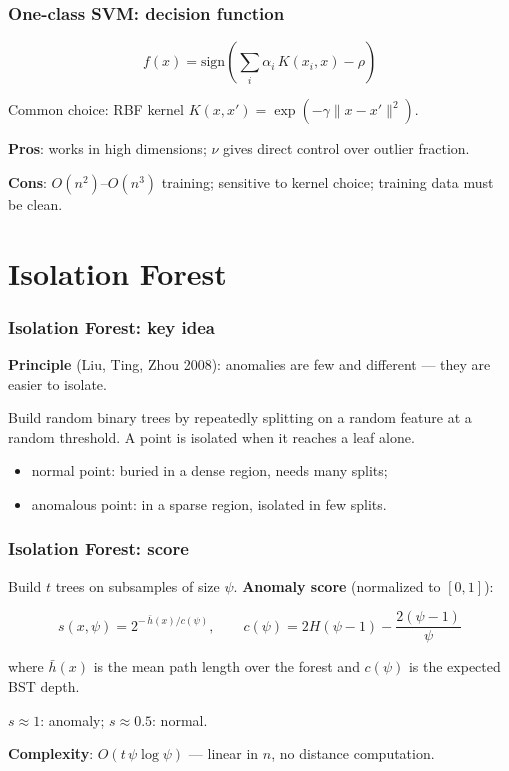 \documentclass[]{beamer}
\begin{document}
\begin{frame}[fragile]
\frametitle{One-class SVM: decision function}
\begin{equation*}
f(x) = \mathrm{sign}\!\left(\sum_{i} \alpha_i\, K(x_i, x) - \rho\right)
\end{equation*}

Common choice: RBF kernel $K(x, x') = \exp(-\gamma \|x - x'\|^2)$.

\textbf{Pros}: works in high dimensions; $\nu$ gives direct control over outlier fraction.

\textbf{Cons}: $O(n^2)$--$O(n^3)$ training; sensitive to kernel choice; training data must be clean.

\end{frame}

\section{Isolation Forest}

\begin{frame}[fragile]
\frametitle{Isolation Forest: key idea}
\textbf{Principle} (Liu, Ting, Zhou 2008): anomalies are few and different --- they are easier to isolate.

Build random binary trees by repeatedly splitting on a random feature at a random threshold. A point is isolated when it reaches a leaf alone.

\begin{itemize}
  \item normal point: buried in a dense region, needs many splits;
  \item anomalous point: in a sparse region, isolated in few splits.
\end{itemize}

\end{frame}

\begin{frame}[fragile]
\frametitle{Isolation Forest: score}
Build $t$ trees on subsamples of size $\psi$. \textbf{Anomaly score} (normalized to $[0,1]$):

\begin{equation*}
s(x,\psi) = 2^{-\,\bar{h}(x) / c(\psi)}, \qquad c(\psi) = 2H(\psi - 1) - \frac{2(\psi-1)}{\psi}
\end{equation*}

where $\bar{h}(x)$ is the mean path length over the forest and $c(\psi)$ is the expected BST depth.

$s \approx 1$: anomaly; $s \approx 0.5$: normal.

\textbf{Complexity}: $O(t\,\psi\log\psi)$ --- linear in $n$, no distance computation.

\end{frame}
\end{document}
